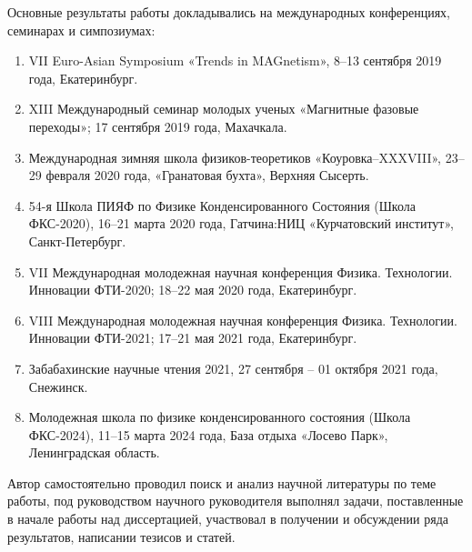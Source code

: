 {\probation}
Основные результаты работы докладывались на международных конференциях, семинарах и симпозиумах:
\begin{enumerate} [beginpenalty=10000]
	\item VII Euro-Asian Symposium «Trends in MAGnetism», 8--13 сентября 2019 года, Екатеринбург.
	\item XIII Международный семинар молодых ученых «Магнитные фазовые переходы»; 17 сентября 2019 года, Махачкала.
	\item Международная зимняя школа физиков-теоретиков «Коуровка–XXXVIII», 23--29 февраля 2020 года, «Гранатовая бухта», Верхняя Сысерть.
	\item 54-я Школа ПИЯФ по Физике Конденсированного Состояния (Школа ФКС-2020), 16--21 марта 2020 года, Гатчина:НИЦ «Курчатовский институт», Санкт-Петербург.
	\item VII Международная молодежная научная конференция Физика. Технологии. Инновации ФТИ-2020; 18--22 мая 2020 года, Екатеринбург.
	\item VIII Международная молодежная научная конференция Физика. Технологии. Инновации ФТИ-2021; 17--21 мая 2021 года, Екатеринбург.
	\item Забабахинские научные чтения 2021, 27 сентября -- 01 октября 2021 года, Снежинск.
	\item Молодежная школа по физике конденсированного состояния (Школа ФКС-2024), 11--15 марта 2024 года, База отдыха «Лосево Парк», Ленинградская область.
\end{enumerate}

{\contribution} Автор самостоятельно проводил поиск и анализ научной литературы по теме работы, под руководством научного руководителя выполнял задачи, поставленные в начале работы над диссертацией, участвовал в получении и обсуждении ряда результатов, написании тезисов и статей.

